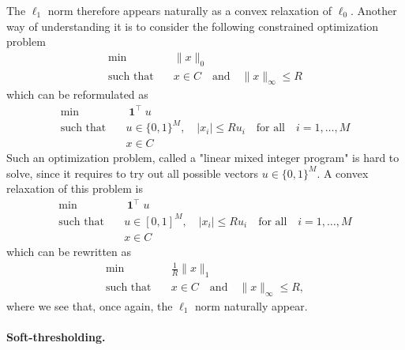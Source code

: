 \documentclass[
	fontsize=11pt, %
	twoside=false, %
	numbers=noenddot, %
]{kaobook}
\DeclareMathOperator{\bone}{\boldsymbol 1}
\newcommand{\norm}[1]{\| #1 \|}
\begin{document}

The $\ell_1$ norm therefore appears naturally as a convex relaxation of $\ell_0$.
Another way of understanding it is to consider the following constrained optimization problem
\begin{align*}
	\min \quad &\norm{x}_0 \\ 
	\text{such that} \quad &x \in C \quad \text{and} \quad \norm{x}_\infty \leq R
\end{align*}
which can be reformulated as
\begin{align*}
	\min \quad &\bone^\top u \\ 
	\text{such that} \quad &u \in \{ 0, 1 \}^M, \quad |x_i| \leq R u_i 
	\quad \text{for all} \quad i=1, \ldots, M \\
	&x \in C
\end{align*}
Such an optimization problem, called a "linear mixed integer program" is hard to solve, since it requires to try out all possible vectors $u \in \{ 0, 1 \}^M$.
A convex relaxation of this problem is
\begin{align*}
	\min \quad &\bone^\top u \\ 
	\text{such that} \quad &u \in [0, 1]^M, \quad |x_i| \leq R u_i 
	\quad \text{for all} \quad i=1, \ldots, M \\
	&x \in C
\end{align*}
which can be rewritten as
\begin{align*}
	\min \quad &\frac 1R \norm{x}_1 \\ 
	\text{such that} \quad &x \in C \quad \text{and} \quad \norm{x}_\infty 
	\leq R,
\end{align*}
where we see that, once again, the $\ell_1$ norm naturally appear.

\paragraph{Soft-thresholding.}
\end{document}
